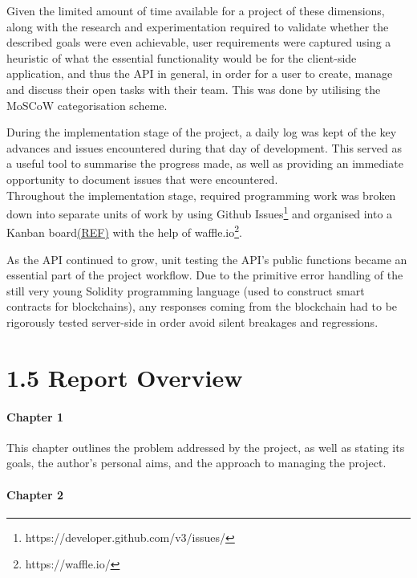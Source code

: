 Given the limited amount of time available for a project of these
dimensions, along with the research and experimentation required to
validate whether the described goals were even achievable, user
requirements were captured using a heuristic of what the essential
functionality would be for the client-side application, and thus the API
in general, in order for a user to create, manage and discuss their open
tasks with their team. This was done by utilising the MoSCoW
categorisation scheme\cite{1moscow}.

During the implementation stage of the project, a daily log was kept of the key advances and issues encountered during
that day of development. This served as a useful tool to summarise the
progress made, as well as providing an immediate opportunity to document
issues that were encountered.\\
Throughout the implementation stage, required programming work was
broken down into separate units of work by using Github
Issues\footnote{https://developer.github.com/v3/issues/} and organised into a Kanban board\href{}{(REF)}
with the help of waffle.io\footnote{https://waffle.io/}.

As the API continued to grow, unit testing the API's public functions became an
essential part of the project workflow. Due to the primitive error
handling of the still very young Solidity programming language (used to
construct smart contracts for blockchains), any responses coming from
the blockchain had to be rigorously tested server-side in order avoid
silent breakages and regressions.

\clearpage

\section{1.5 Report Overview}\label{report-overview}

\paragraph{Chapter 1}\label{chapter-1-1}

This chapter outlines the problem addressed by the project, as well as
stating its goals, the author's personal aims, and the approach to
managing the project.

\paragraph{Chapter 2}\label{chapter-2}

